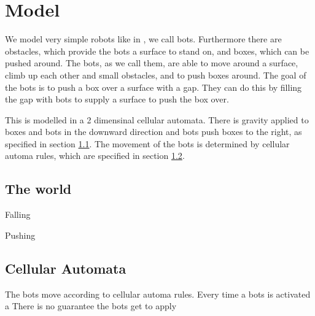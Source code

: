 \section{Model}
\label{sec:model}

We model very simple robots like in \cite{butler02}, we call bots. Furthermore there are
obstacles, which provide the bots a surface to stand on, and boxes, which can be
pushed around. The bots, as we call them, are able to move around a surface,
climb up each other and small obstacles, and to push boxes around. The goal of
the bots is to push a box over a surface with a gap. They can do this by filling
the gap with bots to supply a surface to push the box over.

This is modelled in a 2 dimensinal cellular automata. There is gravity
applied to boxes and bots in the downward direction and bots push boxes to the
right, as specified in section \ref{sec:world}. The movement of the bots is
determined by cellular automa rules, which are specified in section
\ref{sec:ca-rules}.


\subsection{The world}
\label{sec:world}
Falling

Pushing

\subsection{Cellular Automata}
\label{sec:ca-rules}
The bots move according to cellular automa rules. Every time a bots is activated
a There is no guarantee the bots
get to apply 

